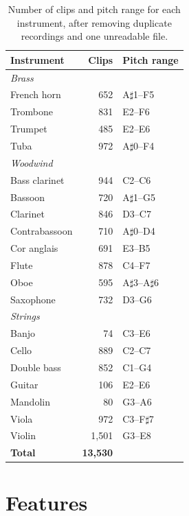 \documentclass[11pt]{article}
\begin{document}
\begin{table}[t]
  \centering
  \small
  \begin{tabular}{lrl}
    \hline
    \textbf{Instrument} & \textbf{Clips} & \textbf{Pitch range} \\
    \hline
    \multicolumn{3}{l}{\textit{Brass}} \\
    French horn    & 652   & A$\sharp$1--F5 \\
    Trombone       & 831   & E2--F6 \\
    Trumpet        & 485   & E2--E6 \\
    Tuba           & 972   & A$\sharp$0--F4 \\
    \hline
    \multicolumn{3}{l}{\textit{Woodwind}} \\
    Bass clarinet  & 944   & C2--C6 \\
    Bassoon        & 720   & A$\sharp$1--G5 \\
    Clarinet       & 846   & D3--C7 \\
    Contrabassoon  & 710   & A$\sharp$0--D4 \\
    Cor anglais    & 691   & E3--B5 \\
    Flute          & 878   & C4--F7 \\
    Oboe           & 595   & A$\sharp$3--A$\sharp$6 \\
    Saxophone      & 732   & D3--G6 \\
    \hline
    \multicolumn{3}{l}{\textit{Strings}} \\
    Banjo          & 74    & C3--E6 \\
    Cello          & 889   & C2--C7 \\
    Double bass    & 852   & C1--G4 \\
    Guitar         & 106   & E2--E6 \\
    Mandolin       & 80    & G3--A6 \\
    Viola          & 972   & C3--F$\sharp$7 \\
    Violin         & 1,501 & G3--E8 \\
    \hline
    \textbf{Total} & \textbf{13,530} & \\
    \hline
  \end{tabular}
  \caption{\label{tab:dataset}
    Number of clips and pitch range for each instrument, after removing duplicate recordings and one unreadable file.
  }
\end{table}

\section{Features}
\label{sec:features}
\end{document}

